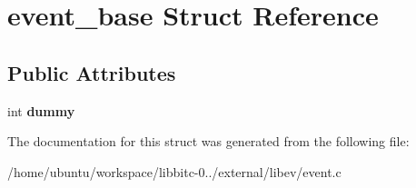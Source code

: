 \hypertarget{structevent__base}{\section{event\-\_\-base Struct Reference}
\label{structevent__base}
}
\subsection*{Public Attributes}
\begin{DoxyCompactItemize}
\item 
\hypertarget{structevent__base_a2a9980f06a6926acffcfccb88b5583fd}{int {\bfseries dummy}}\label{structevent__base_a2a9980f06a6926acffcfccb88b5583fd}

\end{DoxyCompactItemize}


The documentation for this struct was generated from the following file\-:\begin{DoxyCompactItemize}
\item 
/home/ubuntu/workspace/libbitc-\/0../external/libev/event.\-c\end{DoxyCompactItemize}
